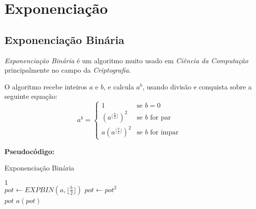 







\section{Exponenciação}

\subsection{Exponenciação Binária}

\textit{Exponenciação Binária} é um algoritmo muito usado em \textit{Ciência da Computação} principalmente no campo da \textit{Criptografia}.

O algoritmo recebe inteiros $a$ e $b$, e calcula $a^b$, usando divisão e conquista sobre a seguinte equação:
\[
 a^b = 
  \begin{cases} 
   1& \text{se } b = 0 \\
   (a^{\lfloor \frac{b}{2} \rfloor})^2& \text{se } b \text{ for par} \\
   a(a^{\lfloor \frac{b}{2} \rfloor})^2& \text{se } b \text{ for impar} 
  \end{cases}
\]

\textbf{Pseudocódigo:}
\begin{algorithm}
\caption{Exponenciação Binária}
\begin{algorithmic}[1]
\State \Return $1$
\EndIf 
\\
\State $pot \gets EXPBIN(a, \lfloor \frac{b}{2} \rfloor)$
\State $pot \gets pot^2$
\\
\State \Return $pot$
\Else
\State \Return $a(pot)$
\EndIf

\EndProcedure
\end{algorithmic}
\end{algorithm}


